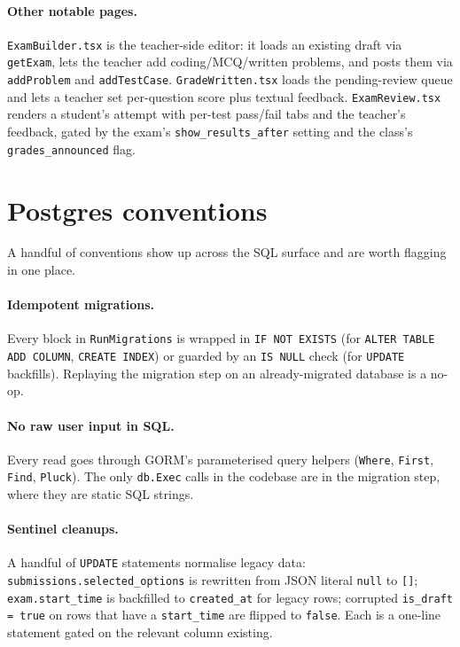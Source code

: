 \paragraph{Other notable pages.} \texttt{ExamBuilder.tsx} is the teacher-side editor: it loads an existing draft via \texttt{getExam}, lets the teacher add coding/MCQ/written problems, and posts them via \texttt{addProblem} and \texttt{addTestCase}. \texttt{GradeWritten.tsx} loads the pending-review queue and lets a teacher set per-question score plus textual feedback. \texttt{ExamReview.tsx} renders a student's attempt with per-test pass/fail tabs and the teacher's feedback, gated by the exam's \texttt{show\_results\_after} setting and the class's \texttt{grades\_announced} flag.

\section{Postgres conventions}

A handful of conventions show up across the SQL surface and are worth flagging in one place.

\paragraph{Idempotent migrations.} Every block in \texttt{RunMigrations} is wrapped in \texttt{IF NOT EXISTS} (for \texttt{ALTER TABLE ADD COLUMN}, \texttt{CREATE INDEX}) or guarded by an \texttt{IS NULL} check (for \texttt{UPDATE} backfills). Replaying the migration step on an already-migrated database is a no-op.

\paragraph{No raw user input in SQL.} Every read goes through GORM's parameterised query helpers (\texttt{Where}, \texttt{First}, \texttt{Find}, \texttt{Pluck}). The only \texttt{db.Exec} calls in the codebase are in the migration step, where they are static SQL strings.

\paragraph{Sentinel cleanups.} A handful of \texttt{UPDATE} statements normalise legacy data: \texttt{submissions.selected\_options} is rewritten from JSON literal \texttt{null} to \texttt{[]}; \texttt{exam.start\_time} is backfilled to \texttt{created\_at} for legacy rows; corrupted \texttt{is\_draft = true} on rows that have a \texttt{start\_time} are flipped to \texttt{false}. Each is a one-line statement gated on the relevant column existing.

